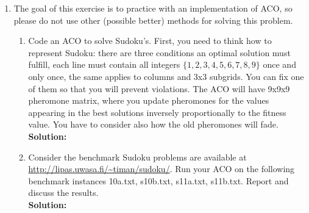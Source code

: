 \documentclass[a4paper]{article}
\begin{document}
\begin{enumerate}
	\item The goal of this exercise is to practice with an implementation of ACO, so please do not use other (possible better) methods for solving this problem.
	
	\begin{enumerate}
		\item Code an ACO to solve Sudoku's. First, you need to think how to represent Sudoku: there are three conditions an optimal solution must fulfill, each line must contain all integers $\{1,2,3,4,5,6,7,8,9 \}$ once and only once, the same applies to columns and 3x3 subgrids. You can fix one of them so that you will prevent violations. The ACO will have 9x9x9 pheromone matrix, where you update pheromones for the values appearing in the best solutions inversely proportionally to the fitness value. You have to consider also how the old pheromones will fade.\\
		\textbf{Solution:}\\
		
		
		\item Consider the benchmark Sudoku problems are available at \url{http://lipas.uwasa.fi/~timan/sudoku/}. Run your ACO on the following benchmark instances \textsf{10a.txt, s10b.txt, s11a.txt, s11b.txt}. Report and discuss the results.\\
		 \textbf{Solution:}\\
		
		
		
	\end{enumerate}
	
\end{enumerate}
\end{document}
